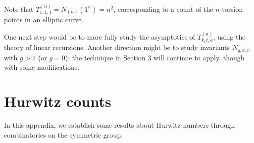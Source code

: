 \documentclass[thesis]{thesis-umich}           %
\theoremstyle{definition}
\begin{document}
  Note that $T_{1,1,1}^{(n)}=N_{(n)}(1^n)=n^2$, corresponding
  to a count of the $n$-torsion points in an elliptic curve.

One next step would
be to more fully study the asymptotics of $T_{k,t,a}^{(n)}$, using
the theory of linear recursions.
Another direction might be to study invariants $N_{g,\sigma,\nu}$ with
$g>1$ (or $g=0$); the technique in Section 3 will continue
to apply, though with some modifications.


\appendix

\chapter{Hurwitz counts}
\label{appendix:hurwitz}

In this appendix, we establish some results about Hurwitz numbers
through combinatorics on the symmetric group.
\end{document}
